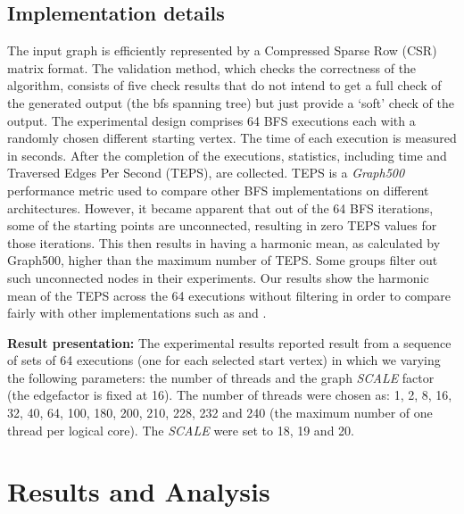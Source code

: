 \documentclass{sig-alternate-05-2015}
\begin{document}
\subsection{Implementation details}
\label{sec:imp}
The input graph is efficiently represented by a Compressed Sparse Row
(CSR) matrix format. The validation method, which checks the
correctness of the algorithm, consists of five check results that do
not intend to get a full check of the generated output (the bfs spanning tree) but just provide a `soft' check of the output.  The
experimental design comprises 64 BFS executions each with a randomly
chosen different starting vertex. The time of each execution is
measured in seconds. After the completion of the executions,
statistics, including time and Traversed Edges Per Second (TEPS), are
collected. TEPS is a \textit{Graph500} performance metric used to
compare other BFS implementations on different architectures. However,
it became apparent that out of the 64 BFS iterations, some of the
starting points are unconnected, resulting in zero TEPS values for
those iterations. This then results in having a harmonic mean, as
calculated by Graph500, higher than the maximum number of TEPS. Some
groups filter out such unconnected nodes in their experiments. Our
results show the harmonic mean of the TEPS across the 64 executions
without filtering in order to compare fairly with other
implementations such as \cite{MICgraphs} and \cite{Beamer:2012}.
 
{\bf Result presentation:} The experimental results reported result
from a sequence of sets of 64 executions (one for each selected start
vertex) in which we varying the following parameters: the number of
threads and the graph
\textit{SCALE} factor (the edgefactor is fixed at 16). The number of threads were chosen as: 1, 2,
8, 16, 32, 40, 64, 100, 180, 200, 210, 228, 232 and 240 (the maximum
number of one thread per logical core). The \textit{SCALE} were set to
18, 19 and 20.













\section{Results and Analysis}
\label{sec:res}
\end{document}

